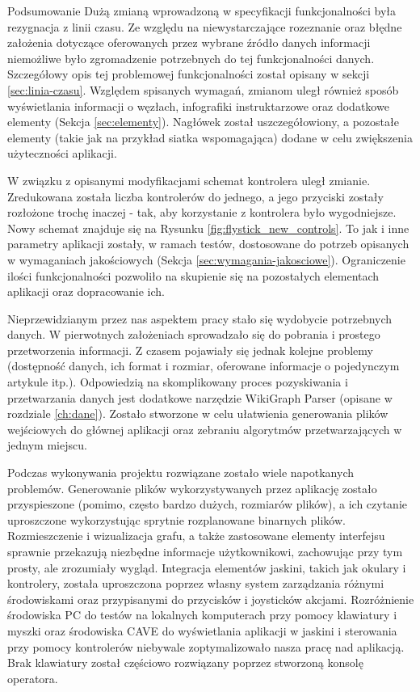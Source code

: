 \begin{chapter}{Podsumowanie}
	Dużą zmianą wprowadzoną w specyfikacji funkcjonalności była rezygnacja z linii czasu. Ze względu na niewystarczające rozeznanie oraz błędne założenia dotyczące oferowanych przez wybrane źródło danych informacji niemożliwe było zgromadzenie potrzebnych do tej funkcjonalności danych. Szczegółowy opis tej problemowej funkcjonalności został opisany w sekcji \ref{sec:linia-czasu}. Względem spisanych wymagań, zmianom uległ również sposób wyświetlania informacji o węzłach, infografiki instruktarzowe oraz dodatkowe elementy (Sekcja \ref{sec:elementy}). Nagłówek został uszczegółowiony, a pozostałe elementy (takie jak na przykład siatka wspomagająca) dodane w celu zwiększenia użyteczności aplikacji.

	W związku z opisanymi modyfikacjami schemat kontrolera uległ zmianie. Zredukowana została liczba kontrolerów do jednego, a jego przyciski zostały rozłożone trochę inaczej - tak, aby korzystanie z kontrolera było wygodniejsze. Nowy schemat znajduje się na Rysunku \ref{fig:flystick_new_controls}. To jak i inne parametry aplikacji zostały, w ramach testów, dostosowane do potrzeb opisanych w wymaganiach jakościowych (Sekcja \ref{sec:wymagania-jakosciowe}). Ograniczenie ilości funkcjonalności pozwoliło na skupienie się na pozostałych elementach aplikacji oraz dopracowanie ich.

	Nieprzewidzianym przez nas aspektem pracy stało się wydobycie potrzebnych danych. W pierwotnych założeniach sprowadzało się do pobrania i prostego przetworzenia informacji. Z czasem pojawiały się jednak kolejne problemy (dostępność danych, ich format i rozmiar, oferowane informacje o pojedynczym artykule itp.). Odpowiedzią na skomplikowany proces pozyskiwania i przetwarzania danych jest dodatkowe narzędzie WikiGraph Parser (opisane w rozdziale \ref{ch:dane}). Zostało stworzone w celu ułatwienia generowania plików wejściowych do głównej aplikacji oraz zebraniu algorytmów przetwarzających w jednym miejscu.

	Podczas wykonywania projektu rozwiązane zostało wiele napotkanych problemów. Generowanie plików wykorzystywanych przez aplikację zostało przyspieszone (pomimo, często bardzo dużych, rozmiarów plików), a ich czytanie uproszczone wykorzystując sprytnie rozplanowane binarnych plików. Rozmieszczenie i wizualizacja grafu, a także zastosowane elementy interfejsu sprawnie przekazują niezbędne informacje użytkownikowi, zachowując przy tym prosty, ale zrozumiały wygląd. Integracja elementów jaskini, takich jak okulary i kontrolery, została uproszczona poprzez własny system zarządzania różnymi środowiskami oraz przypisanymi do przycisków i joysticków akcjami. Rozróżnienie środowiska PC do testów na lokalnych komputerach przy pomocy klawiatury i myszki oraz środowiska CAVE do wyświetlania aplikacji w jaskini i sterowania przy pomocy kontrolerów niebywale zoptymalizowało nasza pracę nad aplikacją. Brak klawiatury został częściowo rozwiązany poprzez stworzoną konsolę operatora.


\end{chapter}
